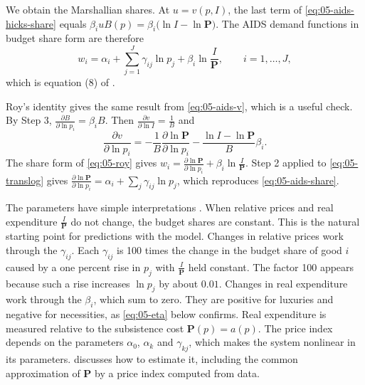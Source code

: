  We obtain the Marshallian shares. At $u = v(p, I)$, the last term of
\eqref{eq:05-aids-hicks-share} equals $\beta_iuB(p) = \beta_i\big(\ln I - \ln\mathbf{P}\big)$. The AIDS demand functions in budget share form are therefore
\begin{equation}\label{eq:05-aids-share}
w_i = \alpha_i + \sum_{j=1}^J\gamma_{ij}\ln p_j + \beta_i\ln\frac{I}{\mathbf{P}} ,
\qquad i = 1, \dots, J,
\end{equation}
which is equation (8) of \citet{DeatonMuellbauer1980a}.

Roy's identity gives the same result from \eqref{eq:05-aids-v}, which is a useful check. By Step 3,
$\frac{\partial B}{\partial\ln p_i} = \beta_iB$. Then $\frac{\partial v}{\partial\ln I} = \frac{1}{B}$ and
\begin{equation*}
\frac{\partial v}{\partial\ln p_i} = -\frac{1}{B}\frac{\partial\ln\mathbf{P}}{\partial\ln p_i}
- \frac{\ln I - \ln\mathbf{P}}{B}\beta_i .
\end{equation*}
The share form of \eqref{eq:05-roy} gives
$w_i = \frac{\partial\ln\mathbf{P}}{\partial\ln p_i} + \beta_i\ln\frac{I}{\mathbf{P}}$. Step 2 applied to
\eqref{eq:05-translog} gives $\frac{\partial\ln\mathbf{P}}{\partial\ln p_i} = \alpha_i + \sum_j\gamma_{ij}\ln
p_j$, which reproduces \eqref{eq:05-aids-share}.

The parameters have simple interpretations \citep[p.~314]{DeatonMuellbauer1980a}. When relative prices and
real expenditure $\frac{I}{\mathbf{P}}$ do not change, the budget shares are constant. This is the natural
starting point for predictions with the model. Changes in relative prices work through the $\gamma_{ij}$.
Each $\gamma_{ij}$ is 100 times the change in the budget share of good $i$ caused by a one percent rise in
$p_j$ with $\frac{I}{\mathbf{P}}$ held constant. The factor 100 appears because such a rise increases
$\ln p_j$ by about $0.01$.
Changes in real expenditure work through the $\beta_i$, which sum to zero. They are positive for luxuries and
negative for necessities, as \eqref{eq:05-eta} below confirms. Real expenditure is measured relative to the
subsistence cost $\mathbf{P}(p) = a(p)$. The price index depends on the parameters $\alpha_0$, $\alpha_k$ and
$\gamma_{kj}$, which makes the system nonlinear in its parameters.  discusses how to
estimate it, including the common approximation of $\mathbf{P}$ by a price index computed from data.

